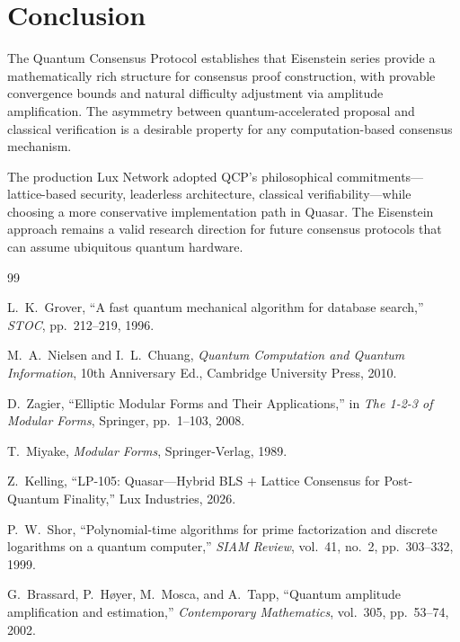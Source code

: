 \documentclass[11pt,a4paper]{article}
\begin{document}
\section{Conclusion}

The Quantum Consensus Protocol establishes that Eisenstein series
provide a mathematically rich structure for consensus proof
construction, with provable convergence bounds and natural
difficulty adjustment via amplitude amplification. The asymmetry
between quantum-accelerated proposal and classical verification is a
desirable property for any computation-based consensus mechanism.

The production Lux Network adopted QCP's philosophical commitments---
lattice-based security, leaderless architecture, classical
verifiability---while choosing a more conservative implementation path
in Quasar. The Eisenstein approach remains a valid research direction
for future consensus protocols that can assume ubiquitous quantum
hardware.


\begin{thebibliography}{99}

L.~K.~Grover, ``A fast quantum mechanical algorithm for database
search,'' \textit{STOC}, pp.~212--219, 1996.

M.~A.~Nielsen and I.~L.~Chuang, \textit{Quantum Computation and
Quantum Information}, 10th Anniversary Ed., Cambridge University
Press, 2010.

D.~Zagier, ``Elliptic Modular Forms and Their Applications,'' in
\textit{The 1-2-3 of Modular Forms}, Springer, pp.~1--103, 2008.

T.~Miyake, \textit{Modular Forms}, Springer-Verlag, 1989.

Z.~Kelling, ``LP-105: Quasar---Hybrid BLS + Lattice Consensus for
Post-Quantum Finality,'' Lux Industries, 2026.

P.~W.~Shor, ``Polynomial-time algorithms for prime factorization and
discrete logarithms on a quantum computer,'' \textit{SIAM Review},
vol.~41, no.~2, pp.~303--332, 1999.

G.~Brassard, P.~H\o yer, M.~Mosca, and A.~Tapp, ``Quantum amplitude
amplification and estimation,'' \textit{Contemporary Mathematics},
vol.~305, pp.~53--74, 2002.

\end{thebibliography}
\end{document}
